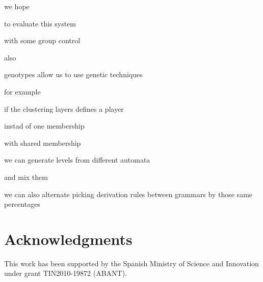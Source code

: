 \documentclass[conference]{IEEEtran}
\begin{document}
we hope

to evaluate this system

with some group control

also

genotypes allow us to use genetic techniques

for example

if the clustering layers defines a player

instad of one membership

with shared membership

we can generate levels from different automata

and mix them

we can also alternate picking derivation rules between grammars by those same percentages


\section*{Acknowledgments}
This work has been supported by the
Spanish Ministry of Science and Innovation under grant
TIN2010-19872 (ABANT).



%

%




\end{document}
